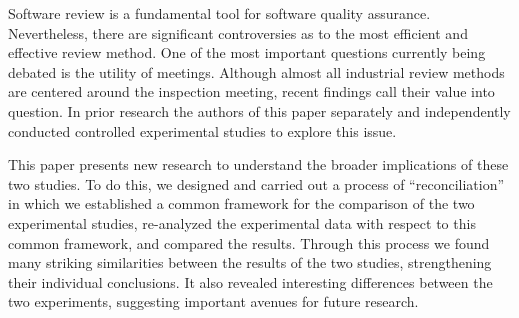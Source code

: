 Software review is a fundamental tool for software quality assurance. 
Nevertheless, there are significant controversies as to the
most efficient and effective review method. One of the most
important questions currently being debated is the utility 
of meetings.  Although almost all industrial review methods 
are centered around the inspection meeting, recent findings 
call their value into question. In prior research the authors 
of this paper separately and independently conducted controlled 
experimental studies to explore this issue.

This paper presents new research to understand the 
broader implications of these two studies. To do this, 
we designed and carried out a process of ``reconciliation'' 
in which we established a common framework
for the comparison of the two experimental studies,
re-analyzed the experimental data with respect to this
common framework, and compared the results. Through 
this process we found many striking similarities between 
the results of the two studies, strengthening their
individual conclusions. It also revealed interesting 
differences between the two experiments, suggesting 
important avenues for future research.






















